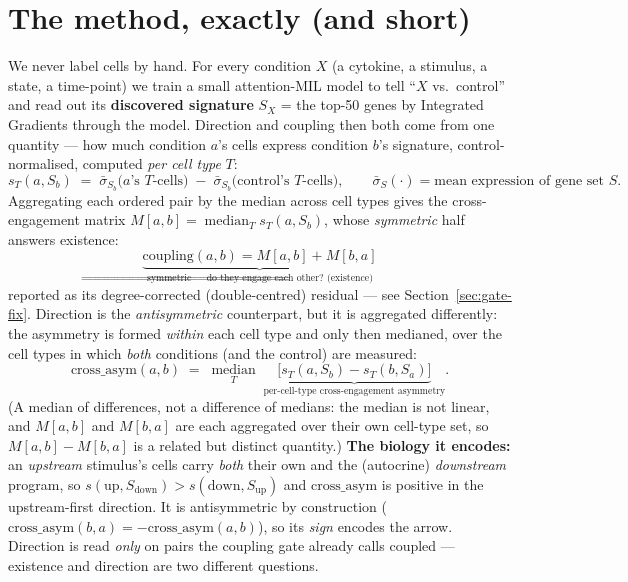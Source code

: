 \documentclass[11pt]{article}
\begin{document}
\section{The method, exactly (and short)}
We never label cells by hand. For every condition $X$ (a cytokine, a stimulus, a state, a
time-point) we train a small attention-MIL model to tell ``$X$ vs.\ control'' and read out its
\textbf{discovered signature} $S_X$ = the top-50 genes by Integrated Gradients through the model.
Direction and coupling then both come from one quantity --- how much condition $a$'s cells express
condition $b$'s signature, control-normalised, computed \emph{per cell type} $T$:
\begin{equation}
s_T(a,S_b)\;=\;\bar\sigma_{S_b}\big(a\text{'s }T\text{-cells}\big)\;-\;\bar\sigma_{S_b}\big(\text{control's }T\text{-cells}\big),
\qquad \bar\sigma_S(\cdot)=\text{mean expression of gene set }S .
\end{equation}
Aggregating each ordered pair by the median across cell types gives the cross-engagement matrix
$M[a,b]=\operatorname{median}_T s_T(a,S_b)$, whose \emph{symmetric} half answers existence:
\begin{equation}
\underbrace{\text{coupling}(a,b)=M[a,b]+M[b,a]}_{\text{symmetric}\;\Rightarrow\;\text{do they engage each other? (existence)}}
\end{equation}
reported as its degree-corrected (double-centred) residual --- see Section~\ref{sec:gate-fix}.
Direction is the \emph{antisymmetric} counterpart, but it is aggregated differently: the
asymmetry is formed \emph{within} each cell type and only then medianed, over the cell types in
which \emph{both} conditions (and the control) are measured:
\begin{equation}
\mathrm{cross\_asym}(a,b)\;=\;\operatorname*{median}_{T}\;\underbrace{\big[s_T(a,S_b)-s_T(b,S_a)\big]}_{\text{per-cell-type cross-engagement asymmetry}} .
\label{eq:cross}
\end{equation}
(A median of differences, not a difference of medians: the median is not linear, and $M[a,b]$
and $M[b,a]$ are each aggregated over their own cell-type set, so $M[a,b]-M[b,a]$ is a related
but distinct quantity.)
\textbf{The biology it encodes:} an \emph{upstream} stimulus's cells carry \emph{both} their own
and the (autocrine) \emph{downstream} program, so $s(\text{up},S_{\text{down}})>s(\text{down},
S_{\text{up}})$ and $\mathrm{cross\_asym}$ is positive in the upstream-first direction. It is
antisymmetric by construction ($\mathrm{cross\_asym}(b,a)=-\mathrm{cross\_asym}(a,b)$), so its
\emph{sign} encodes the arrow. Direction is read \emph{only} on pairs the coupling gate already
calls coupled --- existence and direction are two different questions.
\end{document}
